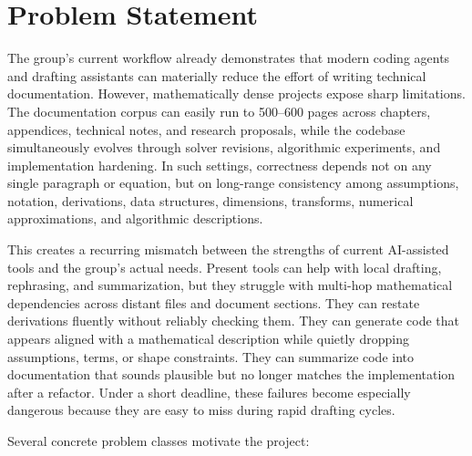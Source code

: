 \chapter{Problem Statement}

The group's current workflow already demonstrates that modern coding agents and drafting assistants can materially reduce the effort of writing technical documentation. However, mathematically dense projects expose sharp limitations. The documentation corpus can easily run to 500--600 pages across chapters, appendices, technical notes, and research proposals, while the codebase simultaneously evolves through solver revisions, algorithmic experiments, and implementation hardening. In such settings, correctness depends not on any single paragraph or equation, but on long-range consistency among assumptions, notation, derivations, data structures, dimensions, transforms, numerical approximations, and algorithmic descriptions.

This creates a recurring mismatch between the strengths of current AI-assisted tools and the group's actual needs. Present tools can help with local drafting, rephrasing, and summarization, but they struggle with multi-hop mathematical dependencies across distant files and document sections. They can restate derivations fluently without reliably checking them. They can generate code that appears aligned with a mathematical description while quietly dropping assumptions, terms, or shape constraints. They can summarize code into documentation that sounds plausible but no longer matches the implementation after a refactor. Under a short deadline, these failures become especially dangerous because they are easy to miss during rapid drafting cycles.

Several concrete problem classes motivate the project:

